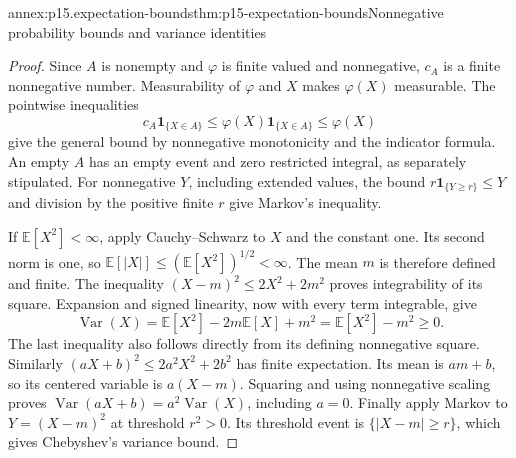 \begin{annexitem}{annex:p15.expectation-bounds}{thm:p15-expectation-bounds}{Nonnegative probability bounds and variance identities}
\begin{proof}
Since \(A\) is nonempty and \(\varphi\) is finite valued and
nonnegative, \(c_A\) is a finite nonnegative number. Measurability
of \(\varphi\) and \(X\) makes \(\varphi(X)\) measurable.
The pointwise inequalities
\[
 c_A\mathbf1_{\{X\in A\}}
 \leq\varphi(X)\mathbf1_{\{X\in A\}}\leq\varphi(X)
\]
give the general bound by nonnegative monotonicity and the indicator
formula. An empty \(A\) has an empty event and zero restricted
integral, as separately stipulated. For nonnegative \(Y\), including
extended values, the bound \(r\mathbf1_{\{Y\geq r\}}\leq Y\)
and division by the positive finite \(r\) give Markov's inequality.

If \(\mathbb E[X^2]<\infty\), apply Cauchy--Schwarz to \(X\)
and the constant one. Its second norm is one, so
\(\mathbb E[|X|]\leq(\mathbb E[X^2])^{1/2}<\infty\).
The mean \(m\) is therefore defined and finite. The inequality
\((X-m)^2\leq2X^2+2m^2\) proves integrability of its square.
Expansion and signed linearity, now with every term integrable, give
\[
 \operatorname{Var}(X)=\mathbb E[X^2]-2m\mathbb E[X]+m^2
                     =\mathbb E[X^2]-m^2\geq0.
\]
The last inequality also follows directly from its defining nonnegative
square. Similarly \((aX+b)^2\leq2a^2X^2+2b^2\) has finite
expectation. Its mean is \(am+b\), so its centered variable is
\(a(X-m)\). Squaring and using nonnegative scaling proves
\(\operatorname{Var}(aX+b)=a^2\operatorname{Var}(X)\), including
\(a=0\). Finally apply Markov to \(Y=(X-m)^2\) at threshold
\(r^2>0\). Its threshold event is \(\{|X-m|\geq r\}\),
which gives Chebyshev's variance bound.
\end{proof}
\end{annexitem}

